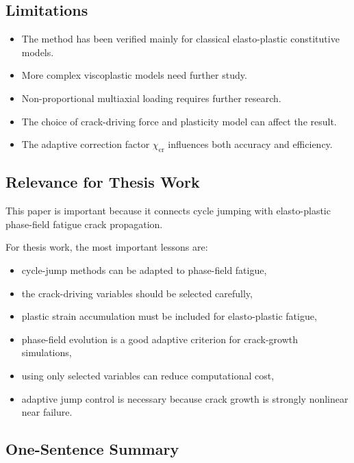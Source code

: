 ﻿\documentclass[11pt,a4paper]{article}
\begin{document}
\subsection{Limitations}

\begin{itemize}[leftmargin=*]
    \item The method has been verified mainly for classical elasto-plastic constitutive models.
    \item More complex viscoplastic models need further study.
    \item Non-proportional multiaxial loading requires further research.
    \item The choice of crack-driving force and plasticity model can affect the result.
    \item The adaptive correction factor $\chi_{\mathrm{cr}}$ influences both accuracy and efficiency.
\end{itemize}

\subsection{Relevance for Thesis Work}

This paper is important because it connects cycle jumping with elasto-plastic phase-field fatigue crack propagation.

For thesis work, the most important lessons are:

\begin{itemize}[leftmargin=*]
    \item cycle-jump methods can be adapted to phase-field fatigue,
    \item the crack-driving variables should be selected carefully,
    \item plastic strain accumulation must be included for elasto-plastic fatigue,
    \item phase-field evolution is a good adaptive criterion for crack-growth simulations,
    \item using only selected variables can reduce computational cost,
    \item adaptive jump control is necessary because crack growth is strongly nonlinear near failure.
\end{itemize}

\subsection{One-Sentence Summary}
\end{document}
